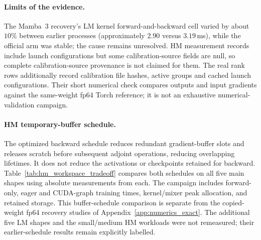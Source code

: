\paragraph{Limits of the evidence.}
The Mamba~3 recovery's LM kernel forward-and-backward cell varied by about
$10\%$ between earlier processes (approximately $2.90$ versus $3.19$\,ms), while
the official arm was stable; the cause remains unresolved. HM measurement records
include launch configurations but some calibration-source fields are null, so
complete calibration-source provenance is not claimed for them. The real rank rows additionally record calibration file hashes, active groups and cached
launch configurations. Their short numerical check compares outputs and input
gradients against the same-weight fp64 Torch reference; it is not an exhaustive
numerical-validation campaign.

\paragraph{HM temporary-buffer schedule.}
The optimized backward schedule reduces redundant gradient-buffer slots and
releases scratch before subsequent adjoint operations, reducing overlapping
lifetimes. It does not reduce the activations or checkpoints retained for
backward. Table~\ref{tab:hm_workspace_tradeoff} compares both schedules on all
five main shapes using absolute measurements from each. The campaign includes
forward-only, eager and CUDA-graph training times, kernel/mixer peak allocation,
and retained storage. This buffer-schedule comparison is separate from the copied-weight fp64
recovery studies of Appendix~\ref{app:numerics_exact}.
The additional five LM shapes and the small/medium HM workloads were not
remeasured; their earlier-schedule results remain explicitly labelled.
